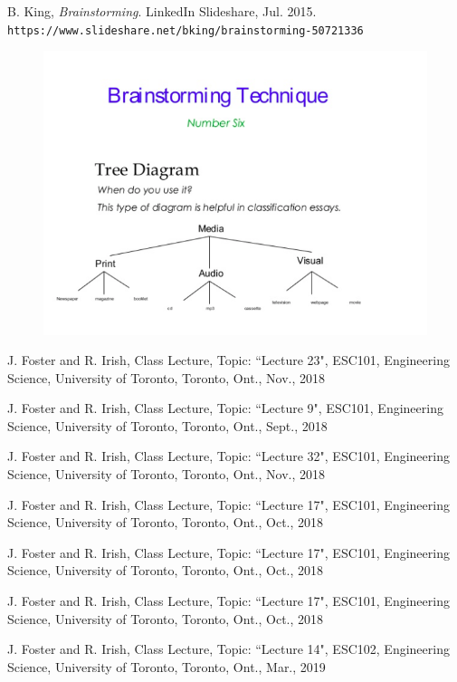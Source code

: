 \documentclass[paper=a4, fontsize=11pt]{article} %
\begin{document}
\begin{thebibliography}{50}
B. King, \textit{Brainstorming}. LinkedIn Slideshare, Jul. 2015. \\\texttt{https://www.slideshare.net/bking/brainstorming-50721336}
\begin{figure}[H]
    \centering
    \includegraphics[width=0.6\linewidth]{tree.png}
\end{figure}

J. Foster and R. Irish, Class Lecture, Topic: ``Lecture 23", ESC101, Engineering Science, University of Toronto, Toronto, Ont., Nov., 2018

J. Foster and R. Irish, Class Lecture, Topic: ``Lecture 9", ESC101, Engineering Science, University of Toronto, Toronto, Ont., Sept., 2018

J. Foster and R. Irish, Class Lecture, Topic: ``Lecture 32", ESC101, Engineering Science, University of Toronto, Toronto, Ont., Nov., 2018

J. Foster and R. Irish, Class Lecture, Topic: ``Lecture 17", ESC101, Engineering Science, University of Toronto, Toronto, Ont., Oct., 2018

J. Foster and R. Irish, Class Lecture, Topic: ``Lecture 17", ESC101, Engineering Science, University of Toronto, Toronto, Ont., Oct., 2018

J. Foster and R. Irish, Class Lecture, Topic: ``Lecture 17", ESC101, Engineering Science, University of Toronto, Toronto, Ont., Oct., 2018

J. Foster and R. Irish, Class Lecture, Topic: ``Lecture 14", ESC102, Engineering Science, University of Toronto, Toronto, Ont., Mar., 2019


\end{thebibliography}
\end{document}
